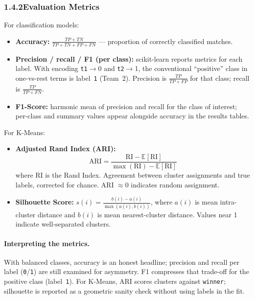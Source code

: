 \documentclass[12pt,a4paper]{article}
\begin{document}
\subsubsection{1.4.2\quad Evaluation Metrics}

For classification models:

\begin{itemize}[leftmargin=1.5em]
    \item \textbf{Accuracy:} $\frac{TP + TN}{TP + TN + FP + FN}$ --- proportion of correctly classified matches.
    \item \textbf{Precision / recall / F1 (per class):} scikit-learn reports metrics for each label. With encoding \texttt{t1}$\rightarrow$0 and \texttt{t2}$\rightarrow$1, the conventional ``positive'' class in one-vs-rest terms is label~\texttt{1} (Team~2). Precision is $\frac{TP}{TP+FP}$ for that class; recall is $\frac{TP}{TP+FN}$.
    \item \textbf{F1-Score:} harmonic mean of precision and recall for the class of interest; per-class and summary values appear alongside accuracy in the results tables.
\end{itemize}

For K-Means:
\begin{itemize}[leftmargin=1.5em]
    \item \textbf{Adjusted Rand Index (ARI):}
    {\small
    \[
    \mathrm{ARI}
    =
    \frac{\mathrm{RI}-\mathbb{E}[\mathrm{RI}]}{\max(\mathrm{RI})-\mathbb{E}[\mathrm{RI}]}
    \]
    }
    where RI is the Rand Index. Agreement between cluster assignments and true labels, corrected for chance. ARI $\approx 0$ indicates random assignment.
    \item \textbf{Silhouette Score:} $s(i) = \frac{b(i) - a(i)}{\max(a(i), b(i))}$, where $a(i)$ is mean intra-cluster distance and $b(i)$ is mean nearest-cluster distance. Values near 1 indicate well-separated clusters.
\end{itemize}

\paragraph{Interpreting the metrics.}
With balanced classes, accuracy is an honest headline; precision and recall per label (\texttt{0}/\texttt{1}) are still examined for asymmetry. F1 compresses that trade-off for the positive class (label~\texttt{1}). For K-Means, ARI scores clusters against \texttt{winner}; silhouette is reported as a geometric sanity check without using labels in the fit.
\end{document}
